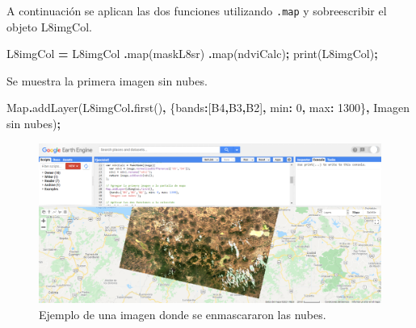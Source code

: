 \documentclass[
  12pt,
  letterpaper,
  twoside]{book}
\newenvironment{Shaded}{\begin{snugshade}}{\end{snugshade}}
\newcommand{\BuiltInTok}[1]{#1}
\newcommand{\DataTypeTok}[1]{\textcolor[rgb]{0.13,0.29,0.53}{#1}}
\newcommand{\DecValTok}[1]{\textcolor[rgb]{0.00,0.00,0.81}{#1}}
\newcommand{\FunctionTok}[1]{\textcolor[rgb]{0.00,0.00,0.00}{#1}}
\newcommand{\NormalTok}[1]{#1}
\newcommand{\OperatorTok}[1]{\textcolor[rgb]{0.81,0.36,0.00}{\textbf{#1}}}
\newcommand{\StringTok}[1]{\textcolor[rgb]{0.31,0.60,0.02}{#1}}
\begin{document}
A continuación se aplican las dos funciones utilizando \texttt{.map} y sobreescribir el objeto L8imgCol.

\begin{Shaded}
\begin{Highlighting}[]
\NormalTok{L8imgCol }\OperatorTok{=}\NormalTok{ L8imgCol}
  \OperatorTok{.}\FunctionTok{map}\NormalTok{(maskL8sr)}
  \OperatorTok{.}\FunctionTok{map}\NormalTok{(ndviCalc)}\OperatorTok{;}
\FunctionTok{print}\NormalTok{(L8imgCol)}\OperatorTok{;}
\end{Highlighting}
\end{Shaded}

Se muestra la primera imagen sin nubes.

\begin{Shaded}
\begin{Highlighting}[]
\BuiltInTok{Map}\OperatorTok{.}\FunctionTok{addLayer}\NormalTok{(L8imgCol}\OperatorTok{.}\FunctionTok{first}\NormalTok{()}\OperatorTok{,} 
\NormalTok{  \{}\DataTypeTok{bands}\OperatorTok{:}\NormalTok{[}\StringTok{\textquotesingle{}B4\textquotesingle{}}\OperatorTok{,}\StringTok{\textquotesingle{}B3\textquotesingle{}}\OperatorTok{,}\StringTok{\textquotesingle{}B2\textquotesingle{}}\NormalTok{]}\OperatorTok{,} \DataTypeTok{min}\OperatorTok{:} \DecValTok{0}\OperatorTok{,} \DataTypeTok{max}\OperatorTok{:} \DecValTok{1300}\NormalTok{\}}\OperatorTok{,}
  \StringTok{\textquotesingle{}Imagen sin nubes\textquotesingle{}}\NormalTok{)}\OperatorTok{;}
\end{Highlighting}
\end{Shaded}

\begin{figure}

{\centering \includegraphics[width=1\linewidth]{Img/imSinNubes} 

}

\caption{Ejemplo de una imagen donde se enmascararon las nubes.}\label{fig:unnamed-chunk-154}
\end{figure}
\end{document}
